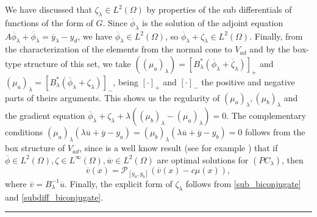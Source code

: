 \documentclass[11pt,a4paper]{amsart}
\newcommand{\kw}{\rule{2mm}{2mm}}
\newcommand{\om}{\Omega}
\renewenvironment{proof}{{Proof.}}{\hfill\kw}
\begin{document}
\begin{proof}
    We have discussed that $\zeta_{\lambda}\in L^2(\Omega)$ by properties of the sub differentials of functions of the form of $G$. Since $\overline{\phi}_{\lambda}$ is the solution of the adjoint equation $A\overline{\phi}_{\lambda}+\overline{\phi}_{\lambda}=\overline{y}_{\lambda}-y_d$, we have $\overline{\phi}_{\lambda}\in L^2(\om)$, so $\overline{\phi}_{\lambda}+\zeta_{\lambda} \in L^2(\Omega)$. Finally, from the characterization of the elements from the normal cone to $V_{ad}$ and by the box-type structure of this set, we take $((\mu_a)_{\lambda})=[B_{\lambda}^*(\overline{\phi}_{\lambda}+\overline{\zeta}_{\lambda})]_+$ and $(\mu_a)_{\lambda}=[B_{\lambda}^*(\overline{\phi}_{\lambda}+\zeta_{\lambda})]_-$, being $[\cdot]_{+}$ and $[\cdot]_-$ the positive and negative parts of theirs arguments. This shows us the regularity of $(\mu_a)_{\lambda}, (\mu_b)_{\lambda}$ and the gradient equation $\overline{\phi}_{\lambda}+\zeta_{\lambda}+\lambda((\mu_b)_{\lambda}-(\mu_a)_{\lambda})=0$. The complementary conditions $(\mu_a)_{\lambda}(\lambda\overline{u}+\overline{y}-y_a)=(\mu_b)_{\lambda}(\lambda\overline{u}+\overline{y}-y_b)=0$ follows from the box structure of $V_{ad}$, since is a well know result (see for example \cite{delosreyes}) that if $\overline{\phi}\in L^2(\om), \zeta\in L^{\infty}(\om), \overline{w}\in L^2(\om)$ are optimal solutions for $(PC_{\lambda})$, then
\[
    \overline{v}(x)=\mathcal{P}_{[y_a,y_b]}(\overline{v}(x)-c\mu(x)),
\]
 where $\overline{v}=B_{\lambda}^{-1}\overline{u}$. Finally, the explicit form of $\zeta_{\lambda}$ follows from \eqref{sub_biconjugate} and \eqref{subdiff_biconjugate}.
\end{proof}\\
\end{document}
